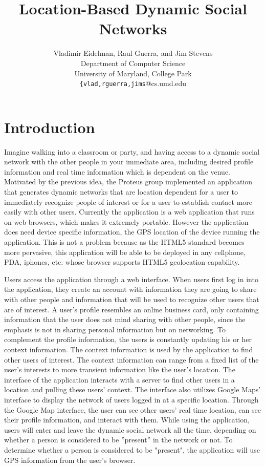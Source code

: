 \documentclass[11pt]{article}
\title{Location-Based Dynamic Social Networks}
\author{
   Vladimir Eidelman, Raul Guerra, and Jim Stevens\\
Department of Computer Science \\
University of Maryland, College Park\\
 {\tt \{vlad,rguerra,jims}@cs.umd.edu}
\begin{document}
\maketitle 

\section{Introduction}


Imagine walking into a classroom or party, and having access to a dynamic social network with the other people in your immediate area, including desired profile information and real time information which is dependent on the venue. Motivated by the previous idea, the Proteus group implemented an application that generates dynamic networks that are location dependent for a user to immediately recognize people of interest or for a user to establish contact more easily with other users. Currently the application is a web application that runs on web browsers, which makes it extremely portable. However the application does need device specific information, the GPS location of the device running the application. This is not a problem because as the HTML5 standard becomes more pervasive, this application will be able to be deployed in any cellphone, PDA, iphones, etc. whose browser supports HTML5 geolocation capability.


Users access the application through a web interface. When users first log in into the application, they create an account with information they are going to share with other people and information that will be used to recognize other users that are of interest. A user's profile resembles an online business card, only containing information that the user does not mind sharing with other people, since the emphasis is not in sharing personal information but on networking.   To complement the profile information, the users is constantly updating his or her context information. The context information is used by the application to find other users of interest. The context information can range from a fixed list of the user's interests to more transient information like the user's location. The interface of the application interacts with a server to find other users in a location and pulling these users' context. The interface also utilizes Google Maps' interface to display the network of users logged in at a specific location. Through the Google Map interface, the user can see other users' real time location, can see their profile information, and interact with them. While using the application, users will enter and leave the dynamic social network all the time, depending on whether a person is considered to be ''present'' in the network or not. To determine whether a person is considered to be "present", the application will use GPS information from the user's browser.
\end{document}
